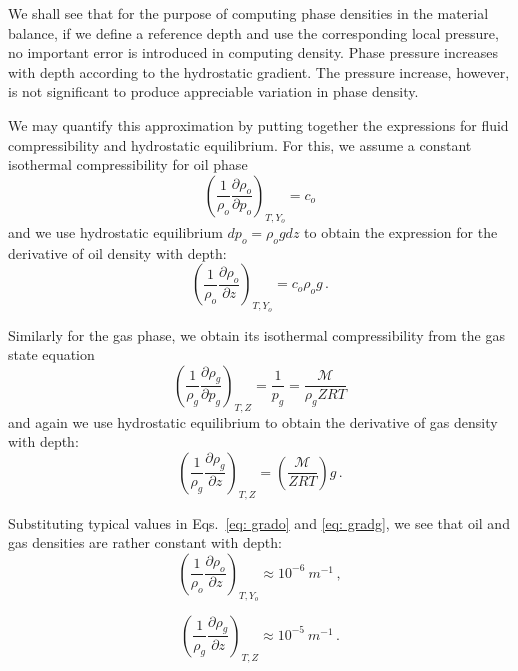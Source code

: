 \documentclass[authoryear,preprint,review,12pt]{elsarticle}
\begin{document}
We shall see that for the purpose of computing phase densities in the material balance, if we define a reference depth and use the corresponding local pressure, no important error is introduced in computing density. Phase pressure increases with depth according to the hydrostatic gradient. The pressure increase, however, is not significant to produce appreciable variation in phase density.


We may quantify this approximation by putting together the expressions for fluid compressibility and hydrostatic equilibrium.
For this, we assume a constant isothermal compressibility for oil phase
\begin{equation}\label{eq: grado}
\left( \frac{1}{\rho_o}\frac{\partial \rho_o}{\partial p_o} \right)_{T,Y_o} = c_o 
\end{equation}
and we use hydrostatic equilibrium $dp_o = \rho_o g dz$ to obtain the expression for the derivative of oil density with depth:
\begin{equation}
\left( \frac{1}{\rho_o}\frac{\partial \rho_o}{\partial z} \right)_{T,Y_o} = c_o \rho_o g \, .
\end{equation}

Similarly for the gas phase, we obtain its isothermal compressibility from the gas state equation
\begin{equation}
\left(\frac{1}{\rho_g}\frac{\partial \rho_g}{\partial p_g}\right)_{T,Z} = \frac{1}{p_g} = \frac{\mathcal{M}}{\rho_g ZRT}
\end{equation}
and again we use hydrostatic equilibrium to obtain the derivative of gas density with depth:
\begin{equation}\label{eq: gradg}
\left(\frac{1}{\rho_g}\frac{\partial \rho_g}{\partial z}\right)_{T,Z} = \left(\frac{\mathcal{M}}{ Z R T}\right) g \, .
\end{equation}


Substituting typical values in Eqs.~\eqref{eq: grado} and \eqref{eq: gradg}, we see that oil and gas densities are rather constant with depth:
\begin{equation}
\left(\frac{1}{\rho_o}\frac{\partial \rho_o}{\partial z}\right)_{T,Y_o} \approx 10^{-6}\ m^{-1} \, ,
\end{equation}

\begin{equation}
\left(\frac{1}{\rho_g}\frac{\partial \rho_g}{\partial z}\right)_{T,Z} \approx 10^{-5}\ m^{-1} \, .
\end{equation}
\end{document}
